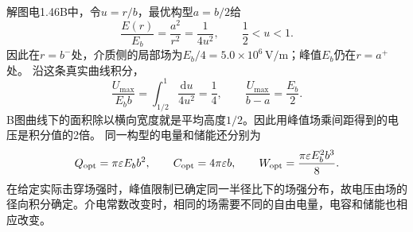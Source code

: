 \documentclass[UTF8,fontset=fandol,a4paper,11pt]{ctexart}
\begin{document}
解图电1.46B中，令$u=r/b$，最优构型$a=b/2$给
\[
\frac{E(r)}{E_b}=\frac{a^2}{r^2}=\frac1{4u^2},
\qquad \frac12<u<1.
\]
因此在$r=b^-$处，介质侧的局部场为$E_b/4=5.0\times10^6\,\mathrm{V/m}$；峰值$E_b$仍在$r=a^+$处。
沿这条真实曲线积分，
\[
\frac{U_{\max}}{E_bb}
=\int_{1/2}^{1}\frac{\mathrm du}{4u^2}=\frac14,
\qquad
\frac{U_{\max}}{b-a}=\frac{E_b}{2}.
\]
B图曲线下的面积除以横向宽度就是平均高度$1/2$。因此用峰值场乘间距得到的电压是积分值的2倍。
同一构型的电量和储能还分别为
\[
Q_{\rm opt}=\pi\varepsilon E_bb^2,\qquad
C_{\rm opt}=4\pi\varepsilon b,\qquad
W_{\rm opt}=\frac{\pi\varepsilon E_b^2b^3}{8}.
\]
在给定实际击穿场强时，峰值限制已确定同一半径比下的场强分布，故电压由场的径向积分确定。介电常数改变时，相同的场需要不同的自由电量，电容和储能也相应改变。
\end{document}
